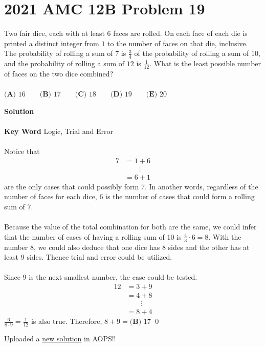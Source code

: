 \documentclass{article}
\newenvironment{solution}{\begin{trivlist}\item[]{\bf Solution}}{\qed \end{trivlist}}
\begin{document}
\section*{2021 AMC 12B Problem 19}
Two fair dice, each with at least $6$ faces are rolled. On each face of each die is printed a distinct integer from $1$ to the number of faces on that die, inclusive. The probability of rolling a sum of $7$ is $\frac34$ of the probability of rolling a sum of $10,$ and the probability of rolling a sum of $12$ is $\frac{1}{12}$. What is the least possible number of faces on the two dice combined?
\\\\
$\textbf{(A) }16 \qquad \textbf{(B) }17 \qquad \textbf{(C) }18\qquad \textbf{(D) }19 \qquad \textbf{(E) }20$
\begin{solution}
\\\\
\textbf{Key Word} Logic, Trial and Error
\\\\
Notice that
\begin{align*}
    7&=1+6 \\
    &\ \ \ \ \ \ \ \ \ \vdots \\
    &=6+1
\end{align*}
are the only cases that could possibly form 7. In another words, regardless of the number of faces for each dice, 6 is the number of cases that could form a rolling sum of 7.
\\\\
Because the value of the total combination for both are the same, we could infer that the number of cases of having a rolling sum of 10 is $\frac{4}{3}\cdot6=8$. With the number 8, we could also deduce that one dice has 8 sides and the other has at least 9 sides. Thence trial and error could be utilized.
\\\\
Since 9 is the next smallest number, the case could be tested.
\begin{align*}
    12&=3+9 \\
    &=4+8 \\
    &\ \ \ \ \ \ \ \ \ \vdots \\
    &=8+4
\end{align*}
$\frac{6}{8\cdot9}=\frac{1}{12}$ is also true. Therefore, $8+9=\boxed{\textbf{(B) }17}$
\end{solution}
Uploaded a 
\href{https://artofproblemsolving.com/wiki/index.php/2021_AMC_12B_Problems/Problem_19#Solution_3_.28Logic.29}{new solution} in AOPS!! \\
\end{document}
